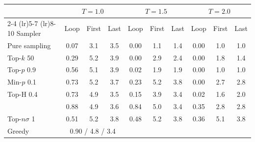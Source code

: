\begin{tabular}{lccccccccc}
\toprule
 & \multicolumn{3}{c}{$T{=}1.0$} & \multicolumn{3}{c}{$T{=}1.5$} & \multicolumn{3}{c}{$T{=}2.0$} \\
\cmidrule(lr){2-4} \cmidrule(lr){5-7} \cmidrule(lr){8-10}
Sampler & Loop & First & Last & Loop & First & Last & Loop & First & Last \\
\midrule
Pure sampling & 0.07 & 3.1 & 3.5 & 0.00 & 1.1 & 1.4 & 0.00 & 1.0 & 1.0 \\
Top-$k$ 50 & 0.29 & 5.2 & 3.9 & 0.00 & 2.9 & 2.4 & 0.00 & 1.8 & 1.4 \\
Top-$p$ 0.9 & 0.56 & 5.1 & 3.9 & 0.02 & 1.9 & 1.9 & 0.00 & 1.0 & 1.0 \\
Min-$p$ 0.1 & 0.73 & 5.2 & 3.7 & 0.23 & 5.2 & 3.8 & 0.00 & 2.7 & 2.8 \\
Top-H 0.4 & 0.73 & 4.9 & 3.5 & 0.15 & 3.9 & 3.4 & 0.02 & 1.6 & 2.0 \\
\pless{} & 0.88 & 4.9 & 3.6 & 0.84 & 5.0 & 3.4 & 0.35 & 2.8 & 2.8 \\
Top-$n\sigma$ 1 & 0.51 & 5.2 & 3.8 & 0.48 & 5.2 & 3.8 & 0.36 & 5.1 & 3.8 \\
\midrule
Greedy & \multicolumn{3}{c}{0.90 / 4.8 / 3.4} &  &  &  &  &  &  \\
\bottomrule
\end{tabular}

